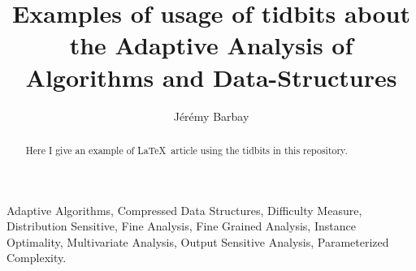 \documentclass{llncs}
\begin{document}
\pagestyle{headings}  %

\mainmatter %
\title{Examples of usage of tidbits about the Adaptive Analysis of Algorithms and Data-Structures} 

\author{J\'er\'emy Barbay}
%
%

\maketitle              %

\begin{abstract}
Here I give an example of \LaTeX\ article using the tidbits in this repository.
\end{abstract}

\begin{center}
  \begin{minipage}{.9\textwidth}
Adaptive Algorithms, 
Compressed Data Structures,
Difficulty Measure,
Distribution Sensitive,
Fine Analysis,
Fine Grained Analysis,
Instance Optimality,
Multivariate Analysis,
Output Sensitive Analysis,
Parameterized Complexity.
  \end{minipage}
\end{center}





\printbibliography
\end{document}
